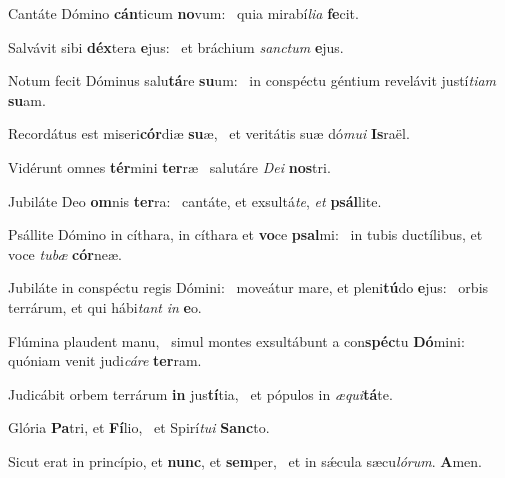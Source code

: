 \item Cantáte Dómino \textbf{cán}ticum \textbf{no}vum:~\psstar{} quia mirabí\textit{lia} \textbf{fe}cit.
\item Salvávit sibi \textbf{déx}tera \textbf{e}jus:~\psstar{} et bráchium \textit{sanctum} \textbf{e}jus.
\item Notum fecit Dóminus salu\textbf{tá}re \textbf{su}um:~\psstar{} in conspéctu géntium revelávit justí\textit{tiam} \textbf{su}am.
\item Recordátus est miseri\textbf{cór}diæ \textbf{su}æ,~\psstar{} et veritátis suæ dó\textit{mui} \textbf{Is}raël.
\item Vidérunt omnes \textbf{tér}mini \textbf{ter}ræ~\psstar{} salutáre \textit{Dei} \textbf{nos}tri.
\item Jubiláte Deo \textbf{om}nis \textbf{ter}ra:~\psstar{} cantáte, et exsultá\textit{te}, \textit{et} \textbf{psál}lite.
\item Psállite Dómino in cíthara, in cíthara et \textbf{vo}ce \textbf{psal}mi:~\psstar{} in tubis ductílibus, et voce \textit{tubæ} \textbf{cór}neæ.
\item Jubiláte in conspéctu regis Dómini:~\pscross{} moveátur mare, et pleni\textbf{tú}do \textbf{e}jus:~\psstar{} orbis terrárum, et qui hábi\textit{tant} \textit{in} \textbf{e}o.
\item Flúmina plaudent manu,~\pscross{} simul montes exsultábunt a con\textbf{spéc}tu \textbf{Dó}mini:~\psstar{} quóniam venit judi\textit{cáre} \textbf{ter}ram.
\item Judicábit orbem terrárum \textbf{in} jus\textbf{tí}tia,~\psstar{} et pópulos in \textit{æqui}\textbf{tá}te.
\item Glória \textbf{Pa}tri, et \textbf{Fí}lio,~\psstar{} et Spirí\textit{tui} \textbf{Sanc}to.
\item Sicut erat in princípio, et \textbf{nunc}, et \textbf{sem}per,~\psstar{} et in sǽcula sæcu\textit{lórum}. \textbf{A}men.